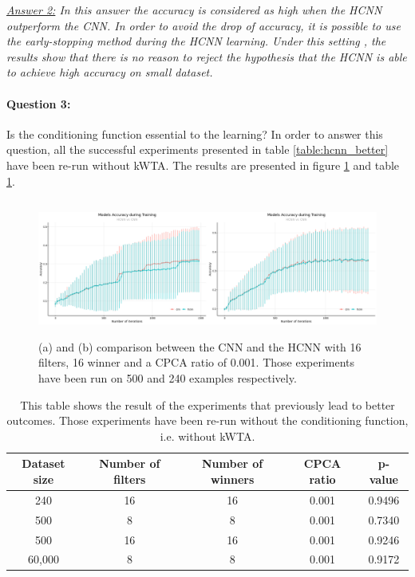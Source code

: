 \documentclass[11pt]{report}
\begin{document}
\noindent \textit{\underline{Answer 2:} In this answer the accuracy is considered as high when the HCNN outperform the CNN. In order to avoid the drop of accuracy, it is possible to use the early-stopping method during the HCNN learning. Under this setting , the results show that there is no reason to reject the hypothesis that the HCNN is able to achieve high accuracy on small dataset.}
\newline
\newline
\paragraph{Question 3:} Is the conditioning function essential to the learning?
\newline
\newline
\noindent In order to answer this question, all the successful experiments presented in table \ref{table:hcnn_better} have been re-run without kWTA. The results are presented in figure \ref{fig:hcnn_conditioning_func} and table \ref{table:conditioning_func}.

\begin{figure}[h]
\centering
\includegraphics[width=12cm, height=4.5cm]{hcnn_conditioning_func}
\caption[Experiment 4: Is the conditioning function essential to the learning?]{(a) and (b) comparison between the CNN and the HCNN with 16 filters, 16 winner and a CPCA ratio of 0.001. Those experiments have been run on 500 and 240 examples respectively.}
\label{fig:hcnn_conditioning_func}
\end{figure}

\begin{table}[h!]
\centering
\begin{tabular}{ c c c c c }
Dataset size & Number of filters & Number of winners & CPCA ratio & p-value\\
\hline
240 & 16 & 16 & 0.001 & 0.9496\\
500 & 8 & 8 & 0.001 & 0.7340\\
500 & 16 & 16 & 0.001 & 0.9246\\
60,000 & 8 & 8 & 0.001 & 0.9172
\end{tabular}
\caption[Experiment: Is the conditioning function essential to the learning?]{This table shows the result of the experiments that previously lead to better outcomes. Those experiments have been re-run without the conditioning function, i.e. without kWTA.}
\label{table:conditioning_func}
\end{table}
\end{document}
